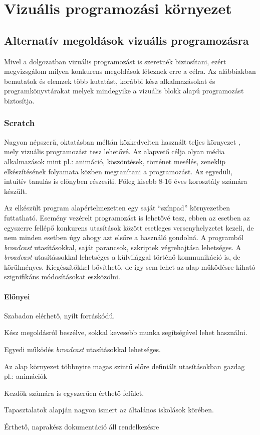 \documentclass[12pt,a4paper,oneside]{report} %
\begin{document}
\section{Vizuális programozási környezet}
\subsection{Alternatív megoldások vizuális programozásra}
\label{vizuprogkor}
Mivel a dolgozatban vizuális  programozást  is szeretnék biztosítani, ezért megvizsgálom milyen konkurens megoldások léteznek erre a célra. Az alábbiakban bemutatok és elemzek több kutatást, korábbi kész alkalmazásokat és programkönyvtárakat melyek mindegyike a vizuális blokk alapú programozást biztosítja.
\subsubsection{Scratch} 
\label{scratch}
Nagyon népszerű, oktatásban méltán közkedvelten használt teljes környezet \cite{maloney2010scratch, resnick2009scratch, ScratchUrl2019Jan}, mely vizuális programozást tesz lehetővé. Az alapvető célja olyan média alkalmazások mint pl.: animáció, köszöntések, történet mesélés, zeneklip elkészítésének folyamata közben megtanítani a programozást. Az egyedüli, intuitív tanulás is előnyben részesíti. Főleg kisebb 8-16 éves korosztály számára készült. 
\par Az elkészült program alapértelmezetten egy saját ``{színpad}'' környezetben futtatható. Esemény vezérelt programozást is lehetővé tesz, ebben az esetben az egyszerre fellépő konkurens utasítások között esetleges versenyhelyzetet kezeli, de nem minden esetben úgy ahogy azt elsőre a használó gondolná.  A programból \textit{broadcast} utasításokkal, saját parancsok, szkriptek végrehajtása lehetséges. A \textit{broadcast} utasítássokkal lehetséges a külvilággal történő kommunikáció is, de körülményes. Kiegészítőkkel bővíthető, de így sem lehet az alap működésre kiható szignifikáns módosításokat eszközölni.
\paragraph{Előnyei} 
\begin{compactitem}
	\item Szabadon elérhető, nyílt forráskódú.
	\item Kész megoldásról beszélve, sokkal kevesebb munka segítségével lehet használni.
	\item Egyedi működés \textit{broadcast} utasításokkal lehetséges.
	\item Az alap környezet többnyire magas szintű előre definiált utasításokban gazdag pl.: animációk
	\item Kezdők számára is egyszerűen érthető felület.
	\item Tapasztalatok alapján nagyon ismert az általános iskolások körében.
	\item Érthető, naprakész dokumentáció áll rendelkezésre
\end{compactitem}
\end{document}
